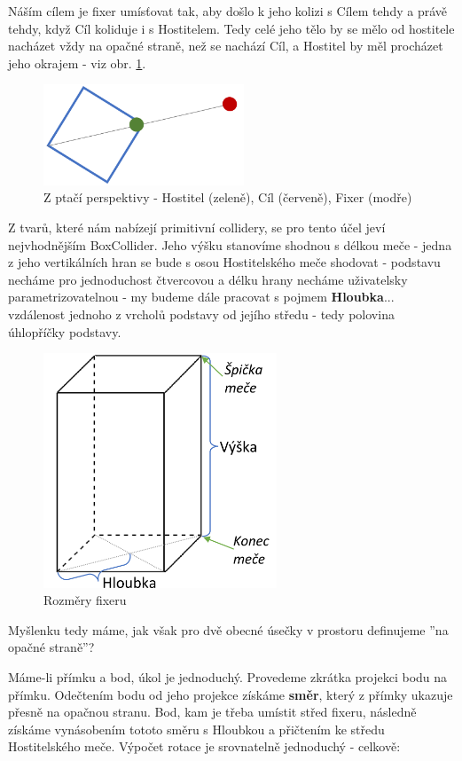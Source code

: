 Náším cílem je fixer umísťovat tak, aby došlo k jeho kolizi s Cílem tehdy a právě tehdy, když Cíl koliduje i s Hostitelem. Tedy celé jeho tělo by se mělo od hostitele nacházet vždy na opačné straně, než se nachází Cíl, a Hostitel by měl procházet jeho okrajem - viz obr. \ref{obr05:fixerBirdseye}. 
\begin{figure}[ht]\centering
  \center
  \includegraphics[height=30mm]{../img/fixerBirdseye.png}
  \caption{Z ptačí perspektivy - Hostitel (zeleně), Cíl (červeně), Fixer (modře)}
  \label{obr05:fixerBirdseye}
\end{figure} 
Z tvarů, které nám nabízejí primitivní collidery, se pro tento účel jeví nejvhodnějším BoxCollider. Jeho výšku stanovíme shodnou s délkou meče - jedna z jeho vertikálních hran se bude s osou Hostitelského meče shodovat - podstavu necháme pro jednoduchost čtvercovou a délku hrany necháme uživatelsky parametrizovatelnou - my budeme dále pracovat s pojmem \textbf{Hloubka}... vzdálenost jednoho z vrcholů podstavy od jejího středu - tedy polovina úhlopříčky podstavy.
\begin{figure}[ht]\centering
  \center
  \includegraphics[height=70mm]{../img/fixerDefinitions.png}
  \caption{Rozměry fixeru}
  \label{obr05:fixerDefinitions}
\end{figure} 

Myšlenku tedy máme, jak však pro dvě obecné úsečky v prostoru definujeme ''na opačné straně''?

\bigbreak

Máme-li přímku a bod, úkol je jednoduchý. Provedeme zkrátka projekci bodu na přímku. Odečtením bodu od jeho projekce získáme \textbf{směr}, který z přímky ukazuje přesně na opačnou stranu. Bod, kam je třeba umístit střed fixeru, následně získáme vynásobením tototo směru s Hloubkou a přičtením ke středu Hostitelského meče. Výpočet rotace je srovnatelně jednoduchý - celkově:   

